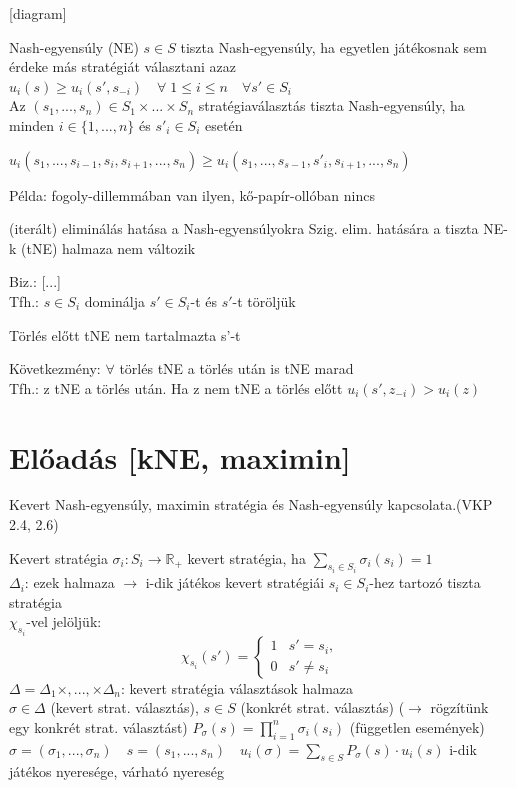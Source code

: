 	[diagram]
	
	\begin{definition}{Nash-egyensúly (NE)}{}
		$s \in S$ tiszta Nash-egyensúly, ha egyetlen játékosnak sem érdeke más stratégiát választani azaz $u_i(s) \geq u_i(s',s_{-i}) \quad \forall \; 1 \leq i \leq n \quad \forall s' \in S_i$ \\
		Az $(s_1, ..., s_n) \in S_1 \times ... \times S_n$ stratégiaválasztás tiszta Nash-egyensúly, ha minden $i \in \{1, ..., n\}$ és $s'_i \in S_i$ esetén
		\begin{center}
			$u_i(s_1, ..., s_{i-1}, s_i, s_{i+1}, ..., s_n) \geq u_i(s_1, ..., s_{s-1}, s'_i, s_{i+1}, ..., s_n)$
		\end{center}
	\end{definition}
	Példa: fogoly-dillemmában van ilyen, kő-papír-ollóban nincs
	
	\begin{theorem}{(iterált) eliminálás
			hatása a Nash-egyensúlyokra}{}
		Szig. elim. hatására a tiszta NE-k (tNE) halmaza nem változik
	\end{theorem}
	Biz.: [...] \\
	Tfh.: $s \in S_i$ dominálja $s' \in S_i$-t és $s'$-t töröljük
	
	\begin{observation}{}{}
		Törlés előtt tNE nem tartalmazta s'-t 
	\end{observation}
	Következmény: $\forall$ törlés tNE a törlés után is tNE marad \\
	Tfh.: z tNE a törlés után. Ha z nem tNE a törlés előtt $u_i(s', z_{-i}) > u_i(z)$
	
	\newpage
	\section{Előadás [kNE, maximin]}
	Kevert Nash-egyensúly, maximin stratégia és Nash-egyensúly kapcsolata.(VKP 2.4, 2.6)
	\begin{definition}{Kevert stratégia}{}
		$\sigma_i : S_i \rightarrow \mathbb{R}_+$ kevert stratégia, ha $\sum_{s_i \in S_i} \sigma_i(s_i) = 1$ \\
		$\Delta_i$: ezek halmaza $\rightarrow$ i-dik játékos kevert stratégiái 
		$s_i \in S_i$-hez tartozó tiszta stratégia \\
		$\chi_{s_i}$-vel jelöljük: 
		\[
		\chi_{s_i}(s') =
		\begin{cases}
			1 & s' = s_i, \\
			0 & s' \neq s_i
		\end{cases}
		\] 
		$\Delta = \Delta_1 \times , ..., \times \Delta_n$: kevert stratégia választások halmaza \\
		$\sigma \in \Delta$ (kevert strat. választás), \quad $s \in S$ (konkrét strat. választás) ($\rightarrow$ rögzítünk egy konkrét strat. választást) $P_\sigma (s) = \prod_{i=1}^n \sigma_i(s_i) $ (független események)\\
		$\sigma = (\sigma_1, ..., \sigma_n) \quad s=(s_1, ..., s_n) \quad u_i(\sigma) = \sum_{s \in S} P_\sigma (s) \cdot u_i(s)$ i-dik  játékos nyeresége, várható nyereség
	\end{definition}
	
